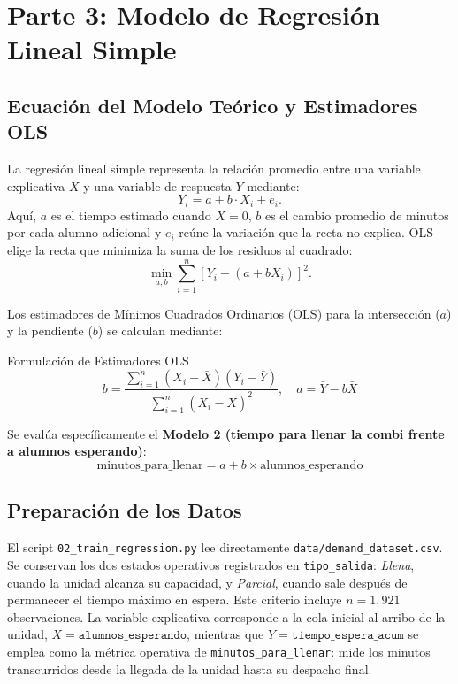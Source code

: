 \section{Parte 3: Modelo de Regresión Lineal Simple}

\subsection{Ecuación del Modelo Teórico y Estimadores OLS}

La regresión lineal simple representa la relación promedio entre una variable explicativa
$X$ y una variable de respuesta $Y$ mediante:
\begin{equation}
	Y_i = a + b \cdot X_i + e_i.
\end{equation}
Aquí, $a$ es el tiempo estimado cuando $X=0$, $b$ es el cambio promedio de minutos por
cada alumno adicional y $e_i$ reúne la variación que la recta no explica. OLS elige la
recta que minimiza la suma de los residuos al cuadrado:
\begin{equation}
    \min_{a,b}\sum_{i=1}^{n}\left[Y_i-(a+bX_i)\right]^2.
\end{equation}

Los estimadores de Mínimos Cuadrados Ordinarios (OLS) para la intersección ($a$) y la pendiente ($b$) se calculan mediante:

\begin{statbox}{Formulación de Estimadores OLS}
	\begin{equation}
		b = \frac{\sum_{i=1}^{n} (X_i - \bar{X})(Y_i - \bar{Y})}{\sum_{i=1}^{n} (X_i - \bar{X})^2}, \quad a = \bar{Y} - b \bar{X}
	\end{equation}
\end{statbox}

Se evalúa específicamente el \textbf{Modelo 2 (tiempo para llenar la combi frente a
alumnos esperando)}:
\begin{equation}
	\text{minutos\_para\_llenar} = a + b \times \text{alumnos\_esperando}
\end{equation}

\subsection{Preparación de los Datos}

El script \texttt{02\_train\_regression.py} lee directamente \texttt{data/demand\_dataset.csv}. Se conservan los dos estados operativos registrados en \texttt{tipo\_salida}: \textit{Llena}, cuando la unidad alcanza su capacidad, y \textit{Parcial}, cuando sale después de permanecer el tiempo máximo en espera. Este criterio incluye $n=1{,}921$ observaciones. La variable explicativa corresponde a la cola inicial al arribo de la unidad, $X=\texttt{alumnos\_esperando}$, mientras que $Y=\texttt{tiempo\_espera\_acum}$ se emplea como la métrica operativa de \texttt{minutos\_para\_llenar}: mide los minutos transcurridos desde la llegada de la unidad hasta su despacho final.


